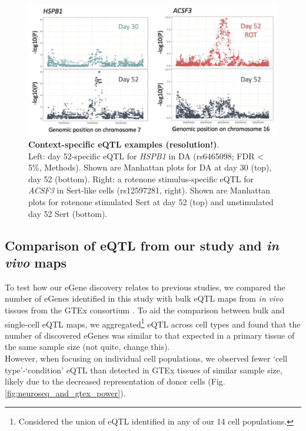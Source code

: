 \begin{figure}[h]
\includegraphics[width=15.5cm]{Chapter5/Fig/neuroseq_eqtl_examples.png}
\caption[Context-specific eQTL examples]{\textbf{Context-specific eQTL examples (resolution!)}.\\
Left: day 52-specific eQTL for \textit{HSPB1} in DA (rs6465098; FDR < 5\%, Methods). 
Shown are Manhattan plots for DA at day 30 (top), day 52 (bottom). 
Right: a rotenone stimulus-specific eQTL for \textit{ACSF3} in Sert-like cells (rs12597281, right). 
Shown are Manhattan plots for rotenone stimulated Sert at day 52 (top) and unstimulated day 52 Sert (bottom).}
\label{fig:neuroseq_eqtl_examples}
\end{figure}

\clearpage

\subsection{Comparison of eQTL from our study and \textit{in vivo} maps}

To test how our eGene discovery relates to previous studies, we compared the number of eGenes identified in this study with bulk eQTL maps from \textit{in vivo} tissues from the GTEx consortium \cite{gtex2017genetic}. 
To aid the comparison between bulk and single-cell eQTL maps,
we aggregated\footnote{Considered the union of eQTL identified in any of our 14 cell populations.} eQTL across cell types and found that the number of discovered eGenes was similar to that expected in a primary tissue of the same sample size (not quite, change this). \\

However, when focusing on individual cell populations, we observed fewer `cell type'-`condition' eQTL than detected in GTEx tissues of similar sample size, likely due to the decreased representation of donor cells (Fig. \ref{fig:neuroseq_and_gtex_power}).\\


